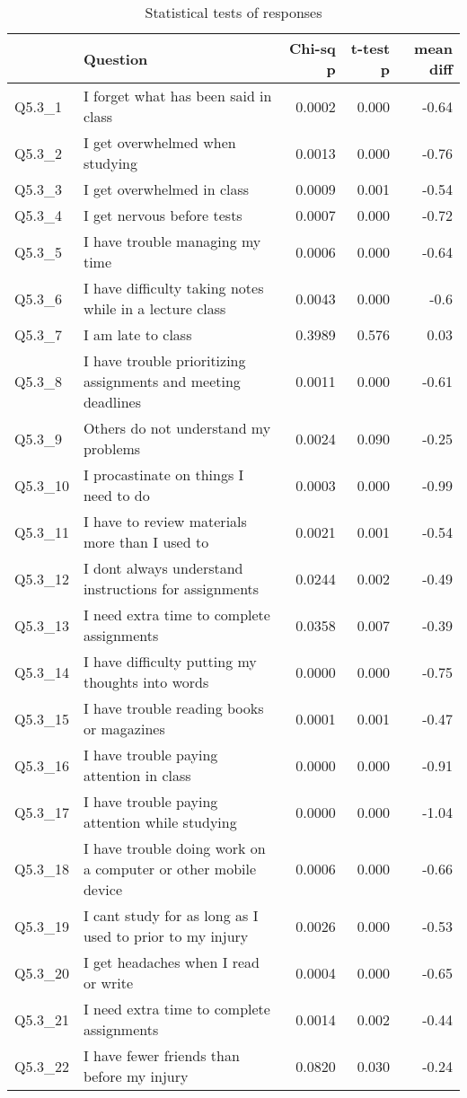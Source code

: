 \documentclass[12]{article}
\begin{document}
\begin{table}[htbp]
\centering
\begin{tabular}{llrrr}
  \hline
 & Question & Chi-sq p & t-test p & mean diff \\ 
  \hline
Q5.3\_1 & I forget what has been said in class & 0.0002 & 0.000 & -0.64 \\ 
  Q5.3\_2 & I get overwhelmed when studying & 0.0013 & 0.000 & -0.76 \\ 
  Q5.3\_3 & I get overwhelmed in class & 0.0009 & 0.001 & -0.54 \\ 
  Q5.3\_4 & I get nervous before tests & 0.0007 & 0.000 & -0.72 \\ 
  Q5.3\_5 & I have trouble managing my time & 0.0006 & 0.000 & -0.64 \\ 
  Q5.3\_6 & I have difficulty taking notes while in a lecture class & 0.0043 & 0.000 & -0.6 \\ 
  Q5.3\_7 & I am late to class & 0.3989 & 0.576 & 0.03 \\ 
  Q5.3\_8 & I have trouble prioritizing assignments and meeting deadlines & 0.0011 & 0.000 & -0.61 \\ 
  Q5.3\_9 & Others do not understand my problems & 0.0024 & 0.090 & -0.25 \\ 
  Q5.3\_10 & I procastinate on things I need to do & 0.0003 & 0.000 & -0.99 \\ 
  Q5.3\_11 & I have to review materials more than I used to & 0.0021 & 0.001 & -0.54 \\ 
  Q5.3\_12 & I dont always understand instructions for assignments & 0.0244 & 0.002 & -0.49 \\ 
  Q5.3\_13 & I need extra time to complete assignments & 0.0358 & 0.007 & -0.39 \\ 
  Q5.3\_14 & I have difficulty putting my thoughts into words & 0.0000 & 0.000 & -0.75 \\ 
  Q5.3\_15 & I have trouble reading books or magazines & 0.0001 & 0.001 & -0.47 \\ 
  Q5.3\_16 & I have trouble paying attention in class & 0.0000 & 0.000 & -0.91 \\ 
  Q5.3\_17 & I have trouble paying attention while studying & 0.0000 & 0.000 & -1.04 \\ 
  Q5.3\_18 & I have trouble doing work on a computer or other mobile device & 0.0006 & 0.000 & -0.66 \\ 
  Q5.3\_19 & I cant study for as long as I used to prior to my injury & 0.0026 & 0.000 & -0.53 \\ 
  Q5.3\_20 & I get headaches when I read or write & 0.0004 & 0.000 & -0.65 \\ 
  Q5.3\_21 & I need extra time to complete assignments & 0.0014 & 0.002 & -0.44 \\ 
  Q5.3\_22 & I have fewer friends than before my injury & 0.0820 & 0.030 & -0.24 \\ 
   \hline
\end{tabular}
\caption{Statistical tests of responses} 
\label{tab:Tab1Summary}
\end{table}
\end{document}
